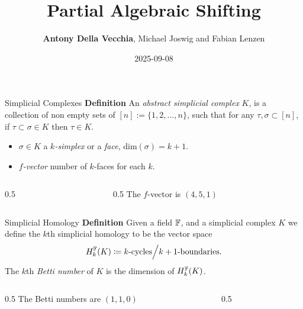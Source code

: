 \documentclass[9pt]{beamer}
\author[Antony Della Vecchia]{\textbf{Antony Della Vecchia}, Michael Joswig and Fabian Lenzen}
\title{Partial Algebraic Shifting}
\institute[]{
  TU Berlin
}
\date{
  2025-09-08
}
\renewenvironment{definition}[1][]
{\textcolor{LineColor}{\textbf{Definition #1}} }
{}
\begin{document}
\maketitle

\begin{frame}[fragile]{Simplicial Complexes}
  \begin{definition}
    An \emph{abstract simplicial complex} $K$, is a collection of non empty sets of $[n] := \{1, 2,\ldots, n\}$,
      such that for any $\tau, \sigma \subset [n]$, if $\tau \subset  \sigma \in K$ then $\tau \in K$.
      \vspace{8mm}
    \begin{itemize}
    \item $\sigma \in K$ a \emph{$k$-simplex} or a \emph{face}, dim$(\sigma) = k + 1$.
    \item \emph{$f$-vector} number of $k$-faces for each $k$.
    \end{itemize}
  \end{definition}
  \begin{columns}
    \begin{column}{0.5\textwidth}
      \centering
      
    \end{column}

    \begin{column}{0.5\textwidth}
      The $f$-vector is $(4, 5, 1)$
    \end{column}
  \end{columns}
\end{frame}




\begin{frame}[fragile]{Simplicial Homology}
  \begin{definition}
    Given a field ${\mathbb F}$, and a simplicial complex $K$ we define the
    $k$th simplicial homology to be the vector space
    \[
      H_k^{{\mathbb F}}(K) \coloneq {k \text{-cycles}}\Big/{ k + 1 \text{-boundaries} }.
    \]
    The $k$th \emph{Betti number} of $K$ is the dimension of $H_k^{{\mathbb F}}(K)$.
  \end{definition}
  \begin{columns}
    \begin{column}{0.5\textwidth}
      The Betti numbers are $(1, 1, 0)$
    \end{column}

    \begin{column}{0.5\textwidth}
      \centering
      
    \end{column}
  \end{columns}
\end{frame}
\end{document}
